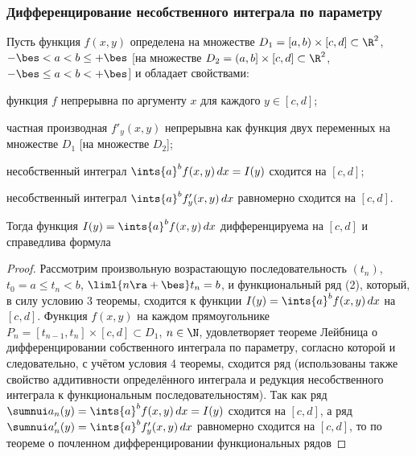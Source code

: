 \documentclass[a4paper]{article}
\begin{document}
\subsubsection{Дифференцирование несобственного интеграла по
параметру}

\begin{theorem}
Пусть функция $f(x,y)$ определена на множестве
$D_1=[a,b)\times[c,d]\subset\R^2$, $-\bes<a<b\le+\bes$ [на множестве
$D_2=(a,b]\times[c,d]\subset\R^2$, $-\bes\le a < b < +\bes$] и
обладает свойствами: \begin{nums}{-2} \item функция $f$ непрерывна
по аргументу $x$ для каждого $y\in[c,d]$; \item частная производная
$f'_y(x,y)$ непрерывна как функция двух переменных на множестве
$D_1$ [на множестве $D_2$]; \item несобственный интеграл $\ints{a}^b
f(x,y)\,dx = I(y)$ сходится на $[c,d]$; \item несобственный интеграл
$\ints{a}^b f'_y(x,y)\,dx$ равномерно сходится на $[c,d]$.
\end{nums} Тогда функция $I(y)=\ints{a}^b f(x,y)\,dx$
дифференцируема на $[c,d]$ и справедлива формула 
\end{theorem}

\begin{proof}
Рассмотрим произвольную возрастающую последовательность $(t_n)$,
$t_0=a\le t_n < b$, $\liml{n\ra+\bes} t_n=b$, и функциональный ряд
(2), который, в силу условию 3 теоремы, сходится к функции $I(y) =
\ints{a}^b f(x,y)\,dx$ на $[c,d]$. Функция $f(x,y)$ на каждом
прямоугольнике $P_n=[t_{n-1},t_n]\times[c,d] \subset D_1$, $n\in\N$,
удовлетворяет теореме Лейбница о дифференцировании собственного
интеграла по параметру, согласно которой  и
следовательно, с учётом условия 4 теоремы, сходится ряд  (использованы также свойство аддитивности определённого
интеграла и редукция несобственного интеграла к функциональным
последовательностям). Так как ряд $\sumnui a_n(y) = \ints{a}^b
f(x,y)\,dx = I(y)$ сходится на $[c,d]$, а ряд $\sumnui a'_n(y) =
\ints{a}^b f'_y(x,y)\,dx$ равномерно сходится на $[c,d]$, то по
теореме о почленном дифференцировании функциональных рядов
\end{proof}
\end{document}
